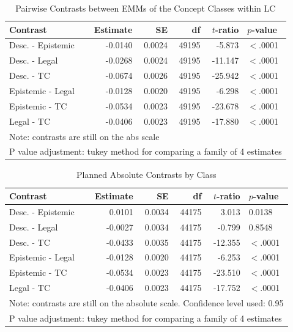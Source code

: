 \documentclass{article}
\begin{document}
\begin{table}[ht]
\centering
\begin{tabular}{lrrrrl}
  \hline
Contrast & Estimate & SE & df & $t$-ratio & $p$-value \\ 
  \hline
\rowcolor{gray!25}Desc. - Epistemic & -0.0140 & 0.0024 & 49195 & -5.873 & $<$.0001 \\ 
  Desc. - Legal & -0.0268 & 0.0024 & 49195 & -11.147 & $<$.0001 \\ 
 \rowcolor{gray!25} Desc. - TC & -0.0674 & 0.0026 & 49195 & -25.942 & $<$.0001 \\ 
  Epistemic - Legal & -0.0128 & 0.0020 & 49195 & -6.298 & $<$.0001 \\ 
 \rowcolor{gray!25} Epistemic - TC & -0.0534 & 0.0023 & 49195 & -23.678 & $<$.0001 \\ 
  Legal - TC & -0.0406 & 0.0023 & 49195 & -17.880 & $<$.0001 \\ 
   \hline
\multicolumn{6}{l}{{\footnotesize Note: contrasts are still on the abs scale}}\\

\multicolumn{6}{l}{{\footnotesize P value adjustment: tukey method for comparing a family of 4 estimates}}\\
\end{tabular}
\caption{Pairwise Contrasts between EMMs of the Concept Classes within LC}
\label{tab:s2m1}
\end{table}

\iffalse
\begin{table}[ht]
\centering
\begin{tabular}{lrrrrl}
  \hline
Contrast & Estimate & SE & df & $t$-ratio & $p$-value \\ 
  \hline
\rowcolor{gray!25}Desc. - Epistemic & 0.0101 & 0.0034 & 44175 & 3.013 & 0.0138 \\ 
  Desc. - Legal & -0.0027 & 0.0034 & 44175 & -0.799 & 0.8548 \\ 
\rowcolor{gray!25}  Desc. - TC & -0.0433 & 0.0035 & 44175 & -12.355 & $<$.0001 \\ 
  Epistemic - Legal & -0.0128 & 0.0020 & 44175 & -6.253 & $<$.0001 \\ 
\rowcolor{gray!25}  Epistemic - TC & -0.0534 & 0.0023 & 44175 & -23.510 & $<$.0001 \\ 
  Legal - TC & -0.0406 & 0.0023 & 44175 & -17.752 & $<$.0001 \\ 
   \hline
\multicolumn{6}{l}{{\footnotesize Note: contrasts are still on the absolute scale. Confidence level used: 0.95}}\\
\multicolumn{6}{l}{{\footnotesize P value adjustment: tukey method for comparing a family of 4 estimates}}\\
\end{tabular}
\caption{Planned Absolute Contrasts by Class}
\label{tab:s2m1}
\end{table}
\end{document}
